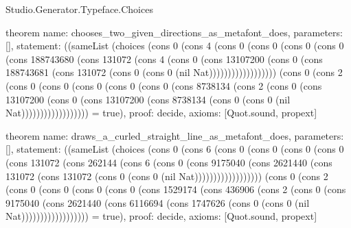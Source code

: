 \begin{lexlean}{Studio.Generator.Typeface.Choices}
\begin{semanticmodule}
theorem{
  name: chooses_two_given_directions_as_metafont_does,
  parameters: [],
  statement: ((sameList (choices (cons 0 (cons 4 (cons 0 (cons 0 (cons 0 (cons 0 (cons 188743680 (cons 131072 (cons 4 (cons 0 (cons 13107200 (cons 0 (cons 188743681 (cons 131072 (cons 0 (cons 0 (nil Nat)))))))))))))))))) (cons 0 (cons 2 (cons 0 (cons 0 (cons 0 (cons 0 (cons 0 (cons 8738134 (cons 2 (cons 0 (cons 13107200 (cons 0 (cons 13107200 (cons 8738134 (cons 0 (cons 0 (nil Nat)))))))))))))))))) = true),
  proof: decide{},
  axioms: [Quot.sound, propext]
}

theorem{
  name: draws_a_curled_straight_line_as_metafont_does,
  parameters: [],
  statement: ((sameList (choices (cons 0 (cons 6 (cons 0 (cons 0 (cons 0 (cons 0 (cons 131072 (cons 262144 (cons 6 (cons 0 (cons 9175040 (cons 2621440 (cons 131072 (cons 131072 (cons 0 (cons 0 (nil Nat)))))))))))))))))) (cons 0 (cons 2 (cons 0 (cons 0 (cons 0 (cons 0 (cons 1529174 (cons 436906 (cons 2 (cons 0 (cons 9175040 (cons 2621440 (cons 6116694 (cons 1747626 (cons 0 (cons 0 (nil Nat)))))))))))))))))) = true),
  proof: decide{},
  axioms: [Quot.sound, propext]
}

\end{semanticmodule}
\end{lexlean}
